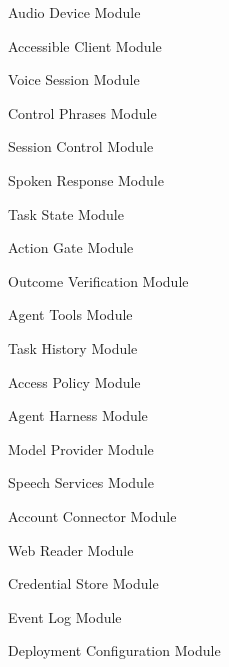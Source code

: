 \documentclass[12pt, titlepage]{article}
\newcounter{mnum}
\newcommand{\mthemnum}{M\themnum}
\begin{document}
\begin{description}[leftmargin=1.2cm]
\item[\refstepcounter{mnum} \mthemnum \label{mAudio}:] Audio Device Module
\item[\refstepcounter{mnum} \mthemnum \label{mClient}:] Accessible Client Module
\item[\refstepcounter{mnum} \mthemnum \label{mVoice}:] Voice Session Module
\item[\refstepcounter{mnum} \mthemnum \label{mPhrase}:] Control Phrases Module
\item[\refstepcounter{mnum} \mthemnum \label{mCtrl}:] Session Control Module
\item[\refstepcounter{mnum} \mthemnum \label{mResponse}:] Spoken Response Module
\item[\refstepcounter{mnum} \mthemnum \label{mTask}:] Task State Module
\item[\refstepcounter{mnum} \mthemnum \label{mGate}:] Action Gate Module
\item[\refstepcounter{mnum} \mthemnum \label{mVerify}:] Outcome Verification Module
\item[\refstepcounter{mnum} \mthemnum \label{mTools}:] Agent Tools Module
\item[\refstepcounter{mnum} \mthemnum \label{mHist}:] Task History Module
\item[\refstepcounter{mnum} \mthemnum \label{mPolicy}:] Access Policy Module
\item[\refstepcounter{mnum} \mthemnum \label{mHarness}:] Agent Harness Module
\item[\refstepcounter{mnum} \mthemnum \label{mModel}:] Model Provider Module
\item[\refstepcounter{mnum} \mthemnum \label{mSpeech}:] Speech Services Module
\item[\refstepcounter{mnum} \mthemnum \label{mAccount}:] Account Connector Module
\item[\refstepcounter{mnum} \mthemnum \label{mWeb}:] Web Reader Module
\item[\refstepcounter{mnum} \mthemnum \label{mCreds}:] Credential Store Module
\item[\refstepcounter{mnum} \mthemnum \label{mLog}:] Event Log Module
\item[\refstepcounter{mnum} \mthemnum \label{mConfig}:] Deployment Configuration Module
\end{description}
\end{document}
